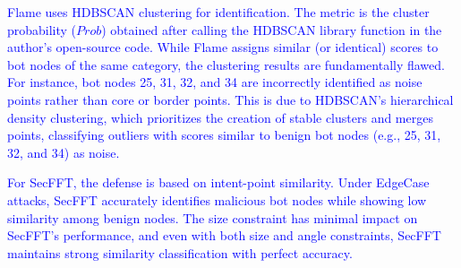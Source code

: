 \documentclass[a4paper,twoside,11pt,dvipsnames]{reviewresponse}
\begin{document}
\textcolor{blue}{Flame uses HDBSCAN clustering for identification. The metric is the cluster probability ($Prob$) obtained after calling the HDBSCAN library function in the author's open-source code. While Flame assigns similar (or identical) scores to bot nodes of the same category, the clustering results are fundamentally flawed. For instance, bot nodes 25, 31, 32, and 34 are incorrectly identified as noise points rather than core or border points. This is due to HDBSCAN's hierarchical density clustering, which prioritizes the creation of stable clusters and merges points, classifying outliers with scores similar to benign bot nodes (e.g., 25, 31, 32, and 34) as noise.}

\textcolor{blue}{For SecFFT, the defense is based on intent-point similarity. Under EdgeCase attacks, SecFFT accurately identifies malicious bot nodes while showing low similarity among benign nodes. The size constraint has minimal impact on SecFFT's performance, and even with both size and angle constraints, SecFFT maintains strong similarity classification with perfect accuracy.}
\end{document}
